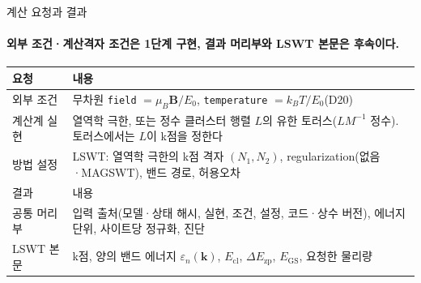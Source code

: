 \begin{frame}[label=request-result]{계산 요청과 결과}
  \framesubtitle{외부 조건·계산격자 조건은 1단계 구현, 결과 머리부와 LSWT 본문은 후속이다.}
  \small
  \begin{tabularx}{\textwidth}{@{}p{2.3cm}Y@{}}
    \toprule
    요청 & 내용 \\
    \midrule
    외부 조건 & 무차원 \texttt{field} $=\mu_B\mathbf B/E_0$, \texttt{temperature} $=k_BT/E_0$(D20) \\
    계산계 실현 & 열역학 극한, 또는 정수 클러스터 행렬 $L$의 유한 토러스($LM^{-1}$ 정수). 토러스에서는 $L$이 k점을 정한다 \\
    방법 설정 & LSWT: 열역학 극한의 k점 격자 $(N_1,N_2)$, regularization(없음·MAGSWT), 밴드 경로, 허용오차 \\
    \midrule
    결과 & 내용 \\
    \midrule
    공통 머리부 & 입력 출처(모델·상태 해시, 실현, 조건, 설정, 코드·상수 버전), 에너지 단위, 사이트당 정규화, 진단 \\
    LSWT 본문 & k점, 양의 밴드 에너지 $\varepsilon_n(\mathbf k)$, $E_{\mathrm{cl}}$, $\Delta E_{\mathrm{zp}}$, $E_{\mathrm{GS}}$, 요청한 물리량 \\
    \bottomrule
  \end{tabularx}
  \par\medskip
\end{frame}
